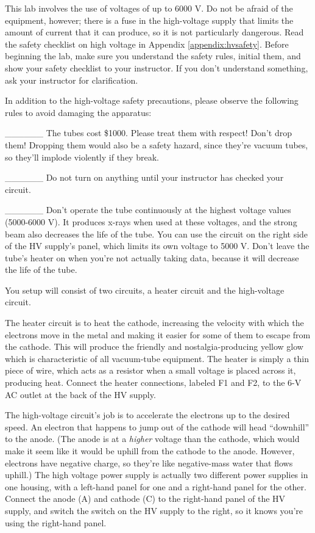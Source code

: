 
This lab involves the use of voltages of up to 6000 V. 
Do not be afraid of the equipment, however;
there is a fuse in the high-voltage supply that limits the
amount of current that it can produce, so it is not
particularly dangerous.  Read the safety checklist on high
voltage in Appendix \ref{appendix:hvsafety}. Before beginning the lab, make sure
you understand the safety rules, initial them, and show your
safety checklist to your instructor. If you don't understand
something, ask your instructor for clarification.

In addition to the high-voltage safety precautions, please
observe the following rules to avoid damaging the apparatus:

\_\_\_\_\_\_ The tubes cost \$1000. Please treat them with
respect! Don't drop them! Dropping them would also be a safety
hazard, since they're vacuum tubes, so they'll implode violently
if they break.

\_\_\_\_\_\_ Do not turn on anything until your instructor
has checked your circuit.

\_\_\_\_\_\_ Don't operate the tube continuously at the highest
voltage values (5000-6000 V). It produces x-rays when used at these
voltages, and the strong beam also decreases the life of the tube.
You can use the circuit on the right side of
the HV supply's panel, which limits its own voltage to 5000 V.
Don't leave the tube's heater on when you're not actually taking
data, because it will decrease the life of the tube.

\setup

You setup will consist
of two circuits, a heater circuit and the high-voltage circuit. 

The heater circuit is to heat the cathode, increasing the
velocity with which the electrons move in the metal and
making it easier for some of them to escape from the
cathode. This will produce the friendly and nostalgia-producing
yellow glow which is characteristic of all vacuum-tube
equipment. The heater is simply a thin piece of wire, which
acts as a resistor when a small voltage is placed across it,
producing heat.
Connect the heater connections, labeled F1 and F2, to the
6-V AC outlet at the back of the HV supply. 

The high-voltage circuit's job is to accelerate the electrons
up to the desired speed. An electron that happens to jump out
of the cathode will head ``downhill'' to the anode. (The anode
is at a \emph{higher} voltage than the cathode, which would make
it seem like it would be uphill from the cathode to the anode.
However, electrons have negative charge, so they're like
negative-mass water that flows uphill.) The high voltage
power supply is actually two different power supplies in one
housing, with a left-hand panel for one and a right-hand panel
for the other.
Connect the
anode (A) and cathode (C) to the right-hand panel of the
HV supply, and switch the switch on the HV supply to the
right, so it knows you're using the right-hand panel.

